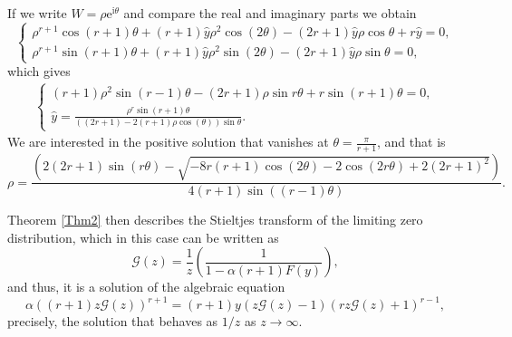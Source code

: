 \documentclass[12pt]{article}
\newcommand{\ii}{\mathrm{i}}
\newcommand{\e}{\mathrm{e}}
\newcommand{\Gt}{\mathcal{G}} %
\numberwithin{equation}{section}
\begin{document}
If we  write $W=\rho \e^{\ii \theta}$ and compare the real and imaginary parts we obtain 
\[
\begin{cases}
	\rho^{r+1}\cos(r+1)\theta + (r+1) \hat{y} \rho^2 \cos(2\theta) - (2r+1) \hat{y} \rho\cos\theta +r  \hat{y} =0, \\ 
	\rho^{r+1}\sin(r+1)\theta + (r+1) \hat{y} \rho^2 \sin(2\theta) - (2r+1) \hat{y} \rho\sin\theta  =0, 
\end{cases}
\]
which gives 
 \begin{align*}
 \begin{cases}
 (r+1)  \rho^2  \sin(r-1)\theta - (2r+1)   \rho \sin r\theta+r    \sin(r+1)\theta=0, \\[0.3cm]
 \hat{y} %
	=  \displaystyle \frac{\rho^{r}\sin(r+1)\theta}{ \left(  (2r+1) - 2 (r+1) \rho \cos(\theta)   \right)\sin\theta} . 
	\end{cases}
 \end{align*}
We are interested in the positive solution that vanishes at $\theta=\frac{\pi}{r+1}$, and that is 
\[
	\rho = \frac{ \left(2 (2 r+1) \sin (r\theta  )-\sqrt{-8 r
   (r+1) \cos (2 \theta )-2 \cos (2r \theta  )+2 (2 r+1)^2}\right)}
   {4
   (r+1)\sin(  (r-1)\theta)}. 
\]
 


Theorem \ref{Thm2} then describes the Stieltjes transform of the limiting zero distribution, which in this case can be written as 
 \[
 	\Gt(z) = \frac{1}{z} \left(  \frac{1}{1-\alpha  (r+1) F(y)}\right), 
 \]
 and thus, it is a solution of the algebraic equation 
\begin{equation}\label{case 2: eq G}
	\alpha  ((r+1) z \Gt(z))^{r+1}  = (r+1) y (z \Gt(z)-1) (r z \Gt(z)+1)^{r-1},
\end{equation}
 precisely, the solution that behaves as $1/z$ as $z\to \infty$. 
  
\end{document}
